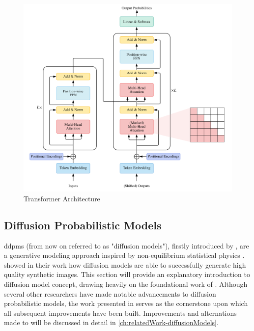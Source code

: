 \begin{figure}

  \includegraphics[width=0.8\linewidth]{images/transformer.png}

\caption{Transformer Architecture} \label{fig:transformer}
\end{figure}


\subsection{Diffusion Probabilistic Models}
\label{ch:preliminaries-generativeAlgorithms-diffusionProbabilisticModels}

\Glspl{ddpm} (from now on referred to as "diffusion models"), firstly introduced by \cite{sohl-dickstein2015DeepUnsupervisedLearning}, are a generative modeling approach inspired by non-equilibrium statistical physics \cite{sohl-dickstein2015DeepUnsupervisedLearning}.
\cite{ho2020DenoisingDiffusionProbabilistic} showed in their work how diffusion models are able to successfully generate high quality synthetic images.
This section will provide an explanatory introduction to diffusion model concept, drawing heavily on the foundational work of \cite{ho2020DenoisingDiffusionProbabilistic}.
Although several other researchers have made notable advancements to  diffusion probabilistic models, the work presented in \cite{ho2020DenoisingDiffusionProbabilistic} 
serves as the cornerstone upon which all subsequent improvements have been built.
Improvements and alternations made to \cite{ho2020DenoisingDiffusionProbabilistic} will be discussed in detail in \autoref{ch:relatedWork-diffusionModels}.

